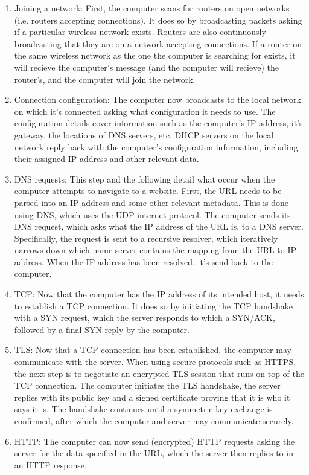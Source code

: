 \documentclass{article}
\begin{document}
\begin{enumerate}
    \item Joining a network: First, the computer scans for routers on open networks (i.e. routers accepting connections). It does so by broadcasting packets asking if a particular wireless network exists. Routers are also continuously broadcasting that they are on a network accepting connections. If a router on the same wireless network as the one the computer is searching for exists, it will recieve the computer's message (and the computer will recieve) the router's, and the computer will join the network. 
    \item Connection configuration: The computer now broadcasts to the local network on which it's connected asking what configuration it needs to use. The configuration details cover information such as the computer's IP address, it's gateway, the locations of DNS servers, etc. DHCP servers on the local network reply back with the computer's configuration information, including their assigned IP address and other relevant data.
    \item DNS requests: This step and the following detail what occur when the computer attempts to navigate to a website. First, the URL needs to be parsed into an IP address and some other relevant metadata. This is done using DNS, which uses the UDP internet protocol. The computer sends its DNS request, which asks what the IP address of the URL is, to a DNS server. Specifically, the request is sent to a recursive resolver, which iteratively narrows down which name server contains the mapping from the URL to IP address. When the IP address has been resolved, it's send back to the computer.
    \item TCP: Now that the computer has the IP address of its intended host, it needs to establish a TCP connection. It does so by initiating the TCP handshake with a SYN request, which the server responds to which a SYN/ACK, followed by a final SYN reply by the computer.
    \item TLS: Now that a TCP connection has been established, the computer may communicate with the server. When using secure protocols such as HTTPS, the next step is to negotiate an encrypted TLS session that runs on top of the TCP connection. The computer initiates the TLS handshake, the server replies with its public key and a signed certificate proving that it is who it says it is. The handshake continues until a symmetric key exchange is confirmed, after which the computer and server may communicate securely.
    \item HTTP: The computer can now send (encrypted) HTTP requests asking the server for the data specified in the URL, which the server then replies to in an HTTP response.
\end{enumerate}
\end{document}
